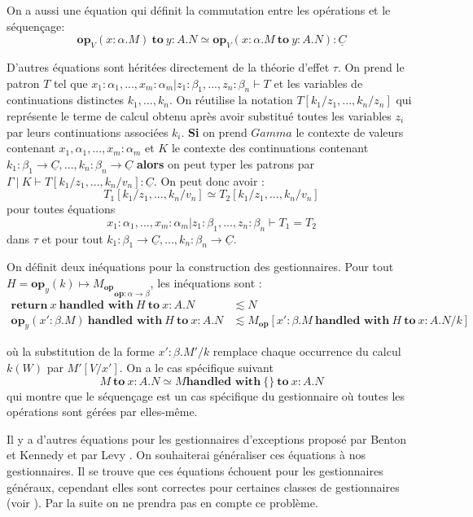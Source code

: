 On a aussi une équation qui définit la commutation entre les opérations et le séquençage:
	\[\textbf{op}_V(x:\alpha.M)~\textbf{to}~y:A.N \simeq \textbf{op}_V(x:\alpha.M~\textbf{to}~y:A.N):\underline{C}\]
\medbreak

D'autres équations sont héritées directement de la théorie d'effet $\tau$. On prend le patron $T$ tel que $x_1:\alpha_1,...,x_m:\alpha_m|z_1:\beta_1,...,z_n:\beta_n \vdash T$ et les variables de continuations distinctes $k_1,...,k_n$. On réutilise la notation $T[k_1/z_1,...,k_n/z_n]$  qui représente le terme de calcul obtenu après avoir substitué toutes les variables $z_i$ par leurs continuations associées $k_i$. 
\medbreak
\textbf{Si} on prend $Gamma$ le contexte de valeurs contenant $x_1,\alpha_1,...,x_m:\alpha_m$ et $K$ le contexte des continuations contenant $k_1:\beta_1 \rightarrow \underline{C},...,k_n:\beta_n \rightarrow \underline{C}$ \textbf{alors} on peut typer les patrons par $\Gamma~|~K \vdash T[k_1/z_1,...,k_n/v_n]:\underline{C}$. On peut donc avoir :
\[T_1[k_1/z_1,...,k_n/v_n] \simeq T_2[k_1/z_1,...,k_n/v_n]\]
pour toutes équations 
\[x_1:\alpha_1,...,x_m:\alpha_m|z_1:\beta_1,...,z_n:\beta_n \vdash T_1 = T_2\]
dans $\tau$ et pour tout $k_1:\beta_1 \rightarrow \underline{C},...,k_n:\beta_n \rightarrow \underline{C}$.
\newpage

On définit deux inéquations pour la construction des gestionnaires. Pour tout $H = {\textbf{op}_y(k) \mapsto M_\textbf{op}}_{\textbf{op}:\alpha \rightarrow \beta}$, les inéquations sont : 
\begin{align*}
	\textbf{return}~x~\textbf{handled~with}~H~\textbf{to}~x:A.N  &\lesssim N\\
	\textbf{op}_y(x':\beta.M)~\textbf{handled~with}~H~\textbf{to}~x:A.N&\lesssim M_\textbf{op}[x':\beta.M~\textbf{handled~with}~H~\textbf{to}~x:A.N/k]
\end{align*}
	
où la substitution de la forme $x':\beta.M'/k$ remplace chaque occurrence du calcul $k(W)$ par $M'[V/x']$. On a le cas spécifique suivant
	\[M~\textbf{to}~x:A.N \simeq M \textbf{handled~with}~\{\}~\textbf{to}~x:A.N\]
qui montre que le séquençage est un cas spécifique du gestionnaire où toutes les opérations sont gérées par elles-même.


Il y a d'autres équations pour les gestionnaires d'exceptions proposé par Benton et Kennedy \cite{DBLP:journals/jfp/BentonK01} et par Levy \cite{DBLP:journals/entcs/Levy06a}. On souhaiterai généraliser ces équations à nos gestionnaires. Il se trouve que ces équations échouent pour les gestionnaires généraux, cependant elles sont correctes pour certaines classes de gestionnaires (voir \cite{DBLP:conf/lics/PlotkinP08}). Par la suite on ne prendra pas en compte ce problème.
\smallbreak

